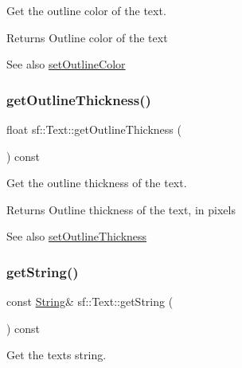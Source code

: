 Get the outline color of the text. 

\begin{DoxyReturn}{Returns}
Outline color of the text
\end{DoxyReturn}
\begin{DoxySeeAlso}{See also}
\hyperlink{classsf_1_1_text_aa19ec69c3b894e963602a6804ca68fe4}{set\+Outline\+Color} 
\end{DoxySeeAlso}
\mbox{\label{classsf_1_1_text_af6bf01c23189edf52c8b38708db6f3f6}} 
\subsubsection{\texorpdfstring{get\+Outline\+Thickness()}{getOutlineThickness()}}
{\footnotesize\ttfamily float sf\+::\+Text\+::get\+Outline\+Thickness (\begin{DoxyParamCaption}{ }\end{DoxyParamCaption}) const}



Get the outline thickness of the text. 

\begin{DoxyReturn}{Returns}
Outline thickness of the text, in pixels
\end{DoxyReturn}
\begin{DoxySeeAlso}{See also}
\hyperlink{classsf_1_1_text_ab0e6be3b40124557bf53737fe6a6ce77}{set\+Outline\+Thickness} 
\end{DoxySeeAlso}
\mbox{\label{classsf_1_1_text_a084c275eb4bca835696af5f8f9c80ab3}} 
\subsubsection{\texorpdfstring{get\+String()}{getString()}}
{\footnotesize\ttfamily const \hyperlink{classsf_1_1_string}{String}\& sf\+::\+Text\+::get\+String (\begin{DoxyParamCaption}{ }\end{DoxyParamCaption}) const}



Get the text\textquotesingle{}s string. 

